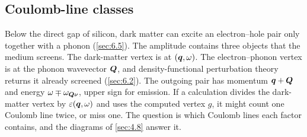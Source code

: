 \subsection{Coulomb-line classes}\label{sec:8.4-lines}

Below the direct gap of silicon, dark matter can excite an electron--hole pair only together with a phonon (\cref{sec:6.5}). The amplitude contains three objects that the medium screens. The dark-matter vertex is at $(\bm{q},\omega)$. The electron--phonon vertex is at the phonon wavevector $\bm{Q}$, and density-functional perturbation theory returns it already screened (\cref{sec:6.2}). The outgoing pair has momentum $\bm{q} + \bm{Q}$ and energy $\omega \mp \omega_{\bm{Q}\nu}$, upper sign for emission. If a calculation divides the dark-matter vertex by $\varepsilon(\bm{q},\omega)$ and uses the computed vertex $g$, it might count one Coulomb line twice, or miss one. The question is which Coulomb lines each factor contains, and the diagrams of \cref{sec:4.8} answer it.

